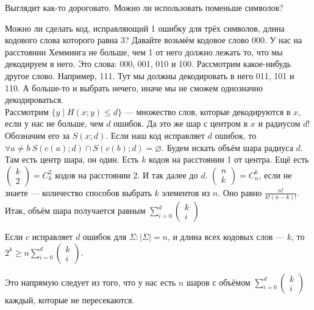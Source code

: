 \documentclass{article}
\begin{document}
\begin{itemize}
\begin{Proof}
        \end{Proof}
        \begin{Comment}
            Выглядит как-то дороговато. Можно ли использовать поменьше символов?
        \end{Comment}
        \begin{Comment}
            Можно ли сделать код, исправляющий 1 ошибку для трёх символов, длина кодового слова которого равна 3? Давайте возьмём кодовое слово 000. У нас на расстоянии Хемминга не больше, чем 1 от него должно лежать то, что мы декодируем в него. Это слова: 000, 001, 010 и 100. Рассмотрим какое-нибудь другое слово. Например, 111. Тут мы должны декодировать в него 011, 101 и 110. А больше-то и выбрать нечего, иначе мы не сможем однозначно декодироваться.\\
            Рассмотрим $\{y\mid H(x;y)\leqslant d\}$ --- множество слов, которые декодируются в $x$, если у нас не больше, чем $d$ ошибок. Да это же шар с центром в $x$ и радиусом $d$! Обозначим его за $S(x;d)$. Если наш код исправляет $d$ ошибок, то $\forall a\neq b~S(c(a);d)\cap S(c(b);d)=\varnothing$. Будем искать объём шара радиуса $d$. Там есть центр шара, он один. Есть $k$ кодов на расстоянии 1 от центра. Ещё есть $\left(\begin{matrix}
                k\\2
            \end{matrix}\right)=C_k^2$ кодов на расстоянии 2. И так далее до $d$.
            $\left(\begin{matrix}
                n\\k
            \end{matrix}\right)=C_n^k$, если не знаете --- количество способов выбрать $k$ элементов из $n$. Оно равно $\frac{n!}{k!(n-k)!}$. Итак, объём шара получается равным $\sum\limits_{i=0}^d\left(\begin{matrix}k\\i\end{matrix}\right)$
        \end{Comment}
        \thm Если $c$ исправляет $d$ ошибок для $\Sigma:|\Sigma|=n$, и длина всех кодовых слов --- $k$, то $2^k\geqslant n\sum\limits_{i=0}^d\left(\begin{matrix}k\\i\end{matrix}\right)$.
        \begin{Proof}
            Это напрямую следует из того, что у нас есть $n$ шаров с объёмом $\sum\limits_{i=0}^d\left(\begin{matrix}k\\i\end{matrix}\right)$ каждый, которые не пересекаются.

\end{Proof}
\end{itemize}
\end{document}
